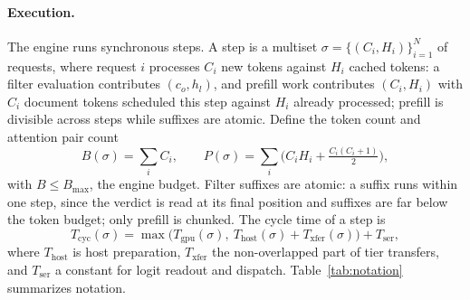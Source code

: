 \documentclass[10pt,twocolumn]{article}
\newcommand{\Tcyc}{T_{\mathrm{cyc}}}
\newcommand{\Tgpu}{T_{\mathrm{gpu}}}
\newcommand{\Thost}{T_{\mathrm{host}}}
\newcommand{\Tser}{T_{\mathrm{ser}}}
\newcommand{\Txfer}{T_{\mathrm{xfer}}}
\newcommand{\Bmax}{B_{\max}}
\begin{document}
\paragraph{Execution.} The engine runs synchronous steps. A step is a multiset $\sigma = \{(C_i, H_i)\}_{i=1}^{N}$ of requests, where request $i$ processes $C_i$ new tokens against $H_i$ cached tokens: a filter evaluation contributes $(c_o, h_l)$, and prefill work contributes $(C_i, H_i)$ with $C_i$ document tokens scheduled this step against $H_i$ already processed; prefill is divisible across steps while suffixes are atomic. Define the token count and attention pair count
\begin{equation}
\label{eq:BP}
B(\sigma) = \sum_i C_i, \qquad
P(\sigma) = \sum_i \Big( C_i H_i + \tfrac{C_i(C_i+1)}{2} \Big),
\end{equation}
with $B \le \Bmax$, the engine budget. Filter suffixes are atomic: a suffix runs within one step, since the verdict is read at its final position and suffixes are far below the token budget; only prefill is chunked. The cycle time of a step is
\begin{equation}
\label{eq:cycle}
\Tcyc(\sigma) = \max\big( \Tgpu(\sigma),\ \Thost(\sigma) + \Txfer(\sigma) \big) + \Tser,
\end{equation}
where $\Thost$ is host preparation, $\Txfer$ the non-overlapped part of tier transfers, and $\Tser$ a constant for logit readout and dispatch. Table~\ref{tab:notation} summarizes notation.
\end{document}
